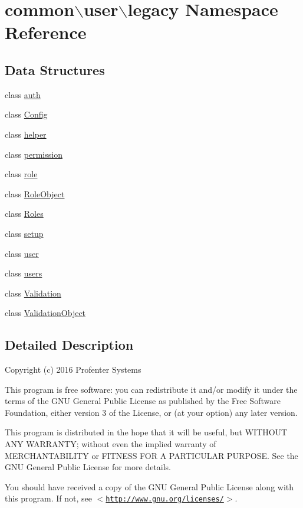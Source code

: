 \hypertarget{namespacecommon_1_1user_1_1legacy}{\section{common$\backslash$user$\backslash$legacy \-Namespace \-Reference}
\label{namespacecommon_1_1user_1_1legacy}
}
\subsection*{\-Data \-Structures}
\begin{DoxyCompactItemize}
\item 
class \hyperlink{classcommon_1_1user_1_1legacy_1_1auth}{auth}
\item 
class \hyperlink{classcommon_1_1user_1_1legacy_1_1_config}{\-Config}
\item 
class \hyperlink{classcommon_1_1user_1_1legacy_1_1helper}{helper}
\item 
class \hyperlink{classcommon_1_1user_1_1legacy_1_1permission}{permission}
\item 
class \hyperlink{classcommon_1_1user_1_1legacy_1_1role}{role}
\item 
class \hyperlink{classcommon_1_1user_1_1legacy_1_1_role_object}{\-Role\-Object}
\item 
class \hyperlink{classcommon_1_1user_1_1legacy_1_1_roles}{\-Roles}
\item 
class \hyperlink{classcommon_1_1user_1_1legacy_1_1setup}{setup}
\item 
class \hyperlink{classcommon_1_1user_1_1legacy_1_1user}{user}
\item 
class \hyperlink{classcommon_1_1user_1_1legacy_1_1users}{users}
\item 
class \hyperlink{classcommon_1_1user_1_1legacy_1_1_validation}{\-Validation}
\item 
class \hyperlink{classcommon_1_1user_1_1legacy_1_1_validation_object}{\-Validation\-Object}
\end{DoxyCompactItemize}


\subsection{\-Detailed \-Description}
\-Copyright (c) 2016 \-Profenter \-Systems

\-This program is free software\-: you can redistribute it and/or modify it under the terms of the \-G\-N\-U \-General \-Public \-License as published by the \-Free \-Software \-Foundation, either version 3 of the \-License, or (at your option) any later version.

\-This program is distributed in the hope that it will be useful, but \-W\-I\-T\-H\-O\-U\-T \-A\-N\-Y \-W\-A\-R\-R\-A\-N\-T\-Y; without even the implied warranty of \-M\-E\-R\-C\-H\-A\-N\-T\-A\-B\-I\-L\-I\-T\-Y or \-F\-I\-T\-N\-E\-S\-S \-F\-O\-R \-A \-P\-A\-R\-T\-I\-C\-U\-L\-A\-R \-P\-U\-R\-P\-O\-S\-E. \-See the \-G\-N\-U \-General \-Public \-License for more details.

\-You should have received a copy of the \-G\-N\-U \-General \-Public \-License along with this program. \-If not, see $<$\href{http://www.gnu.org/licenses/}{\tt http\-://www.\-gnu.\-org/licenses/}$>$. 